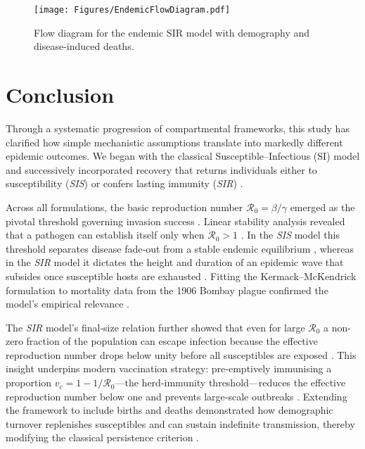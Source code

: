 \documentclass[11pt]{article}
\newcommand{\RR}{\mathcal{R}_0}
\begin{document}
\begin{figure}[H]
  \centering
  \texttt{[image: Figures/EndemicFlowDiagram.pdf]}
  \caption{Flow diagram for the endemic SIR model with demography and
           disease-induced deaths.}
  \label{fig:flowdiagram}
\end{figure}

\section{Conclusion}

Through a systematic progression of compartmental frameworks, this study has
clarified how simple mechanistic assumptions translate into markedly different
epidemic outcomes. We began with the classical Susceptible–Infectious (SI)
model \citep{Anderson1991} and successively incorporated recovery that returns
individuals either to susceptibility (\textit{SIS}) \citep{Hethcote2000} or
confers lasting immunity (\textit{SIR}) \citep{Kermack1927}.

Across all formulations, the basic reproduction number
$\RR = \beta/\gamma$ emerged as the pivotal threshold governing invasion
success \citep{Diekmann1990}. Linear stability analysis revealed that a
pathogen can establish itself only when $\RR > 1$ \citep{Anderson1991}.  
In the \textit{SIS} model this threshold separates disease fade‐out from a
stable endemic equilibrium \citep{Keeling2008}, whereas in the \textit{SIR}
model it dictates the height and duration of an epidemic wave that subsides
once susceptible hosts are exhausted \citep{Brauer2019}. Fitting the
Kermack–McKendrick formulation to mortality data from the 1906 Bombay plague
confirmed the model’s empirical relevance \citep{Kermack1927}.

The \textit{SIR} model’s final‐size relation further showed that even for large
$\RR$ a non-zero fraction of the population can escape infection because the
effective reproduction number drops below unity before all susceptibles are
exposed \citep{Hethcote2000}. This insight underpins modern vaccination
strategy: pre‐emptively immunising a proportion
$v_c = 1 - 1/\RR$—the herd‐immunity threshold—reduces the effective
reproduction number below one and prevents large‐scale outbreaks
\citep{Fine2011}. Extending the framework to include births and deaths
demonstrated how demographic turnover replenishes susceptibles and can sustain
indefinite transmission, thereby modifying the classical persistence criterion
\citep{Anderson1991}.
\end{document}

